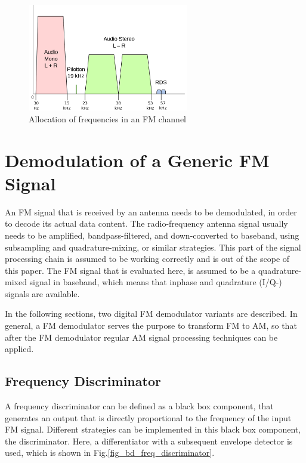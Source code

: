 \documentclass[conference]{IEEEtran}
\begin{document}
    \begin{figure}[!h]
      \centering
        \includegraphics[width=7cm]{img/fm-channel-baseband.png}
      \caption{Allocation of frequencies in an FM channel \cite{ref_fig_channel_freqs}}
      \label{fig_channel_baseband_freqs}
    \end{figure}


\section{Demodulation of a Generic FM Signal}
\label{sec_fm_sig_demod}
  An FM signal that is received by an antenna needs to be demodulated, in order to decode its actual data content.
  The radio-frequency antenna signal usually needs to be amplified, bandpass-filtered, and down-converted to baseband, using subsampling and quadrature-mixing, or similar strategies.
  This part of the signal processing chain is assumed to be working correctly and is out of the scope of this paper.
  The FM signal that is evaluated here, is assumed to be a quadrature-mixed signal in baseband, which means that inphase and quadrature (I/Q-) signals are available.


  In the following sections, two digital FM demodulator variants are described.
  In general, a FM demodulator serves the purpose to transform FM to AM, so that after the FM demodulator regular AM signal processing techniques can be applied.

  \subsection{Frequency Discriminator}
    A frequency discriminator can be defined as a black box component, that generates an output that is directly proportional to the frequency of the input FM signal.
    Different strategies can be implemented in this black box component, the discriminator.
    Here, a differentiator with a subsequent envelope detector is used, which is shown in Fig.\ref{fig_bd_freq_discriminator}.
\end{document}
